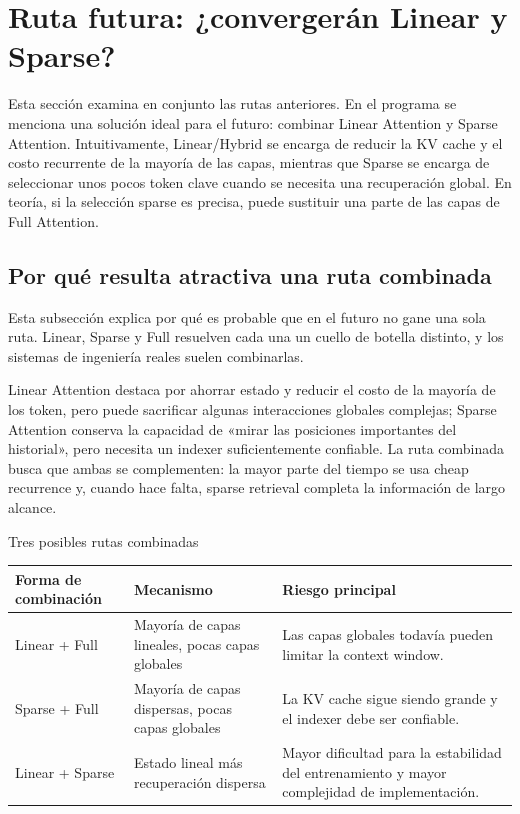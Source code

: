 \section{Ruta futura: ¿convergerán Linear y Sparse?}

Esta sección examina en conjunto las rutas anteriores. En el programa se menciona una solución ideal para el futuro: combinar Linear Attention y Sparse Attention. Intuitivamente, Linear/Hybrid se encarga de reducir la KV cache y el costo recurrente de la mayoría de las capas, mientras que Sparse se encarga de seleccionar unos pocos token clave cuando se necesita una recuperación global. En teoría, si la selección sparse es precisa, puede sustituir una parte de las capas de Full Attention.

\subsection{Por qué resulta atractiva una ruta combinada}

Esta subsección explica por qué es probable que en el futuro no gane una sola ruta. Linear, Sparse y Full resuelven cada una un cuello de botella distinto, y los sistemas de ingeniería reales suelen combinarlas.

Linear Attention destaca por ahorrar estado y reducir el costo de la mayoría de los token, pero puede sacrificar algunas interacciones globales complejas; Sparse Attention conserva la capacidad de «mirar las posiciones importantes del historial», pero necesita un indexer suficientemente confiable. La ruta combinada busca que ambas se complementen: la mayor parte del tiempo se usa cheap recurrence y, cuando hace falta, sparse retrieval completa la información de largo alcance.

\begin{knowledgebox}{Tres posibles rutas combinadas}
\begin{tabularx}{\textwidth}{p{}p{}X}
\toprule
Forma de combinación & Mecanismo & Riesgo principal \\
\midrule
Linear + Full & Mayoría de capas lineales, pocas capas globales & Las capas globales todavía pueden limitar la context window. \\
Sparse + Full & Mayoría de capas dispersas, pocas capas globales & La KV cache sigue siendo grande y el indexer debe ser confiable. \\
Linear + Sparse & Estado lineal más recuperación dispersa & Mayor dificultad para la estabilidad del entrenamiento y mayor complejidad de implementación. \\
\bottomrule
\end{tabularx}
\end{knowledgebox}

